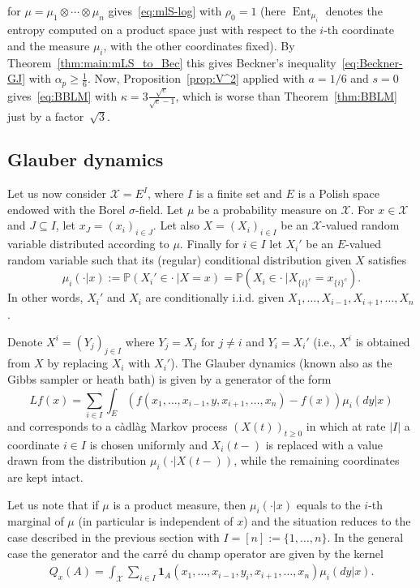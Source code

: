 \documentclass[a4paper]{amsart}
\theoremstyle{definition}
\theoremstyle{remark}
\numberwithin{equation}{section}
\newcommand*{\PP}{\mathbb{P}} %
\DeclareMathOperator{\Ent}{Ent}	%
\newcommand*{\ind}[1]{\mathbf{1}_{#1}}
\begin{document}
for $\mu = \mu_1\otimes\cdots\otimes \mu_n$ gives~\eqref{eq:mlS-log} with $\rho_0 = 1$ (here $\Ent_{\mu_i}$ denotes the entropy computed on a product space just with respect to the $i$-th coordinate and the measure $\mu_i$, with the other coordinates fixed). By Theorem~\ref{thm:main:mLS_to_Bec} this gives Beckner's inequality~\eqref{eq:Beckner-GJ} with $\alpha_p \ge \frac{1}{6}$. 
Now, Proposition~\ref{prop:V^2} applied with $a = 1/6$ and $s = 0$ gives~\eqref{eq:BBLM} with $\kappa = 3\frac{\sqrt{e}}{\sqrt{e}-1}$, which is worse than Theorem~\ref{thm:BBLM} just by a factor~$\sqrt{3}$.

\subsection{Glauber dynamics} \label{sec:Glauber}

Let us now consider $\mathcal{X} = E^I$, where $I$ is a finite set and $E$ is a Polish space endowed with the Borel $\sigma$-field. Let $\mu$ be  a probability measure on $\mathcal{X}$. For $x \in \mathcal{X}$ and $J \subseteq I$, let $x_J = (x_i)_{i\in J}$. Let also $X=(X_i)_{i\in I}$ be an $\mathcal{X}$-valued random variable distributed according to $\mu$. Finally for $i\in I$ let $X_i'$ be an $E$-valued random variable such that its (regular) conditional distribution given $X$ satisfies
\begin{displaymath}
  \mu_i(\cdot|x) := \PP(X_i' \in \cdot \ |X = x) = \PP(X_i\in \cdot \ |X_{\{i\}^c} = x_{\{i\}^c}).
\end{displaymath}
In other words, $X_i'$ and $X_i$ are conditionally i.i.d. given $X_1,\ldots,X_{i-1},X_{i+1},\ldots,X_n$.

Denote $X^i = (Y_j)_{j\in I}$ where $Y_j = X_j$ for $j\neq i$ and $Y_i= X_i'$ (i.e., $X^i$ is obtained from $X$ by replacing $X_i$ with $X_i'$). The Glauber dynamics (known also as the Gibbs sampler or heath bath) is given by a generator of the form
\begin{displaymath}
  L f(x) = \sum_{i \in I} \int_{E} (f(x_1,\ldots,x_{i-1},y,x_{i+1},\ldots,x_n) - f(x)) \mu_i(dy|x)
\end{displaymath}
and corresponds to a c\`adl\`ag Markov process $(X(t))_{t\ge 0}$ in which at rate $|I|$ a coordinate $i\in I$ is chosen uniformly and  $X_i(t-)$ is replaced with a value drawn from the distribution  $\mu_i(\cdot|X(t-))$, while the remaining coordinates are kept intact.

Let us note that if $\mu$ is a product measure, then $\mu_i(\cdot|x)$ equals to the $i$-th marginal of $\mu$ (in particular is independent of $x$) and the situation reduces to the case described in the previous section with $I=[n]:=\{1,\ldots,n\}$. In the general case the generator and the carr\'e du champ operator are given by the kernel
\begin{align}\label{eq:Glauber-Q}
Q_x(A) = \int_{\mathcal{X}}\sum_{i\in I} \ind{A}(x_1,\ldots,x_{i-1},y_i,x_{i+1},\ldots,x_n)\mu_i(dy|x).
\end{align}
\end{document}
